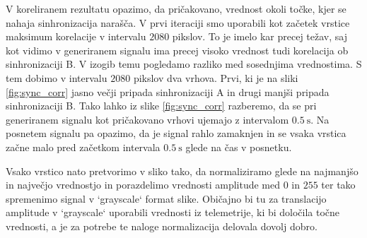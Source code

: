 \documentclass{article}
\begin{document}
V koreliranem rezultatu opazimo, da pričakovano, vrednost okoli točke, kjer se nahaja sinhronizacija narašča. V prvi iteraciji smo uporabili kot začetek vrstice maksimum korelacije v intervalu $2080$ pikslov. To je imelo kar precej težav, saj kot vidimo v generiranem signalu ima precej visoko vrednost tudi korelacija ob sinhronizaciji B. V izogib temu pogledamo razliko med sosednjima vrednostima. S tem dobimo v intervalu $2080$ pikslov dva vrhova. Prvi, ki je na sliki \ref{fig:sync_corr} jasno večji pripada sinhronizaciji A in drugi manjši pripada sinhronizaciji B. Tako lahko iz slike \ref{fig:sync_corr} razberemo, da se pri generiranem signalu kot pričakovano vrhovi ujemajo z intervalom $\SI{0.5}{\second}$. Na posnetem signalu pa opazimo, da je signal rahlo zamaknjen in se vsaka vrstica začne malo pred začetkom intervala $\SI{0.5}{\second}$ glede na čas v posnetku.

Vsako vrstico nato pretvorimo v sliko tako, da normaliziramo glede na najmanjšo in največjo vrednostjo in porazdelimo vrednosti amplitude med $0$ in $255$ ter tako spremenimo signal v `grayscale` format slike. Običajno bi tu za translacijo amplitude v `grayscale` uporabili vrednosti iz telemetrije, ki bi določila točne vrednosti, a je za potrebe te naloge normalizacija delovala dovolj dobro.
\newpage
\end{document}

